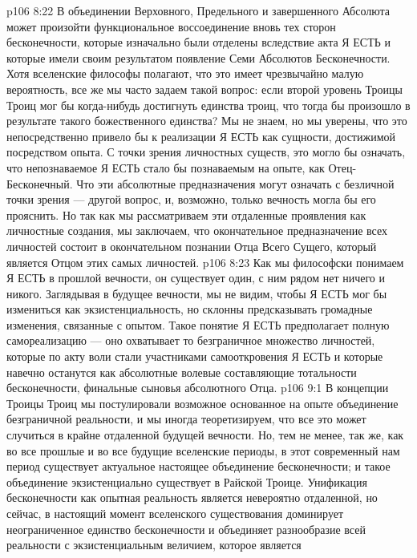 \vs p106 8:22 В объединении Верховного, Предельного и завершенного Абсолюта может произойти функциональное воссоединение вновь тех сторон бесконечности, которые изначально были отделены вследствие акта Я ЕСТЬ и которые имели своим результатом появление Семи Абсолютов Бесконечности. Хотя вселенские философы полагают, что это имеет чрезвычайно малую вероятность, все же мы часто задаем такой вопрос: если второй уровень Троицы Троиц мог бы когда\hyp{}нибудь достигнуть единства троиц, что тогда бы произошло в результате такого божественного единства? Мы не знаем, но мы уверены, что это непосредственно привело бы к реализации Я ЕСТЬ как сущности, достижимой посредством опыта. С точки зрения личностных существ, это могло бы означать, что непознаваемое Я ЕСТЬ стало бы познаваемым на опыте, как Отец\hyp{}Бесконечный. Что эти абсолютные предназначения могут означать с безличной точки зрения --- другой вопрос, и, возможно, только вечность могла бы его прояснить. Но так как мы рассматриваем эти отдаленные проявления как личностные создания, мы заключаем, что окончательное предназначение всех личностей состоит в окончательном познании Отца Всего Сущего, который является Отцом этих самых личностей.
\vs p106 8:23 Как мы философски понимаем Я ЕСТЬ в прошлой вечности, он существует один, с ним рядом нет ничего и никого. Заглядывая в будущее вечности, мы не видим, чтобы Я ЕСТЬ мог бы измениться как экзистенциальность, но склонны предсказывать громадные изменения, связанные с опытом. Такое понятие Я ЕСТЬ предполагает полную самореализацию --- оно охватывает то безграничное множество личностей, которые по акту воли стали участниками самооткровения Я ЕСТЬ и которые навечно останутся как абсолютные волевые составляющие тотальности бесконечности, финальные сыновья абсолютного Отца.
\vs p106 9:1 В концепции Троицы Троиц мы постулировали возможное основанное на опыте объединение безграничной реальности, и мы иногда теоретизируем, что все это может случиться в крайне отдаленной будущей вечности. Но, тем не менее, так же, как во все прошлые и во все будущие вселенские периоды, в этот современный нам период существует актуальное настоящее объединение бесконечности; и такое объединение экзистенциально существует в Райской Троице. Унификация бесконечности как опытная реальность является невероятно отдаленной, но сейчас, в настоящий момент вселенского существования доминирует неограниченное единство бесконечности и объединяет разнообразие всей реальности с экзистенциальным величием, которое является 
